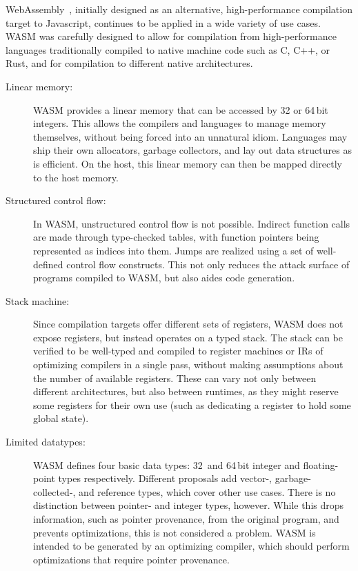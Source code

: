 WebAssembly~\cite{haas2017bringing}, initially designed as an alternative, high-performance compilation target to Javascript, continues to be applied in a wide variety of use cases.
\Ac{WASM} was carefully designed to allow for compilation from high-performance languages traditionally compiled to native machine code such as C, C++, or Rust, and for compilation to different native architectures.
\begin{description}
    \item[Linear memory:] \Ac{WASM} provides a linear memory that can be accessed by 32 or 64\,bit integers.
    This allows the compilers and languages to manage memory themselves, without being forced into an unnatural idiom.
    Languages may ship their own allocators, garbage collectors, and lay out data structures as is efficient.
    On the host, this linear memory can then be mapped directly to the host memory.
    \item[Structured control flow:] In \ac{WASM}, unstructured control flow is not possible.
    Indirect function calls are made through type-checked tables, with function pointers being represented as indices into them.
    Jumps are realized using a set of well-defined control flow constructs.
    This not only reduces the attack surface of programs compiled to \ac{WASM}, but also aides code generation. 
    \item[Stack machine:] Since compilation targets offer different sets of registers, \ac{WASM} does not expose registers, but instead operates on a typed stack.
    The stack can be verified to be well-typed and compiled to register machines or \acp{IR} of optimizing compilers in a single pass, without making assumptions about the number of available registers.
    These can vary not only between different architectures, but also between runtimes, as they might reserve some registers for their own use (such as dedicating a register to hold some global state).
    \item[Limited datatypes:] \Ac{WASM} defines four basic data types: 32\, and 64\,bit integer and floating-point types respectively.
    Different proposals add \mbox{vector-}, \mbox{garbage-collected-}, and reference types, which cover other use cases.
    There is no distinction between pointer- and integer types, however.
    While this drops information, such as pointer provenance, from the original program, and prevents optimizations, this is not considered a problem.
    \Ac{WASM} is intended to be generated by an optimizing compiler, which should perform optimizations that require pointer provenance.
\end{description}

